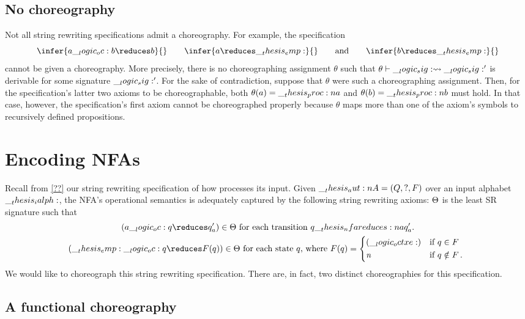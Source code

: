 \clearpage
\subsection{No choreography}

Not all string rewriting specifications admit a choreography.
For example, the specification
\begin{equation*}
  \infer{a \oc b \reduces b}{}
  \qquad
  \infer{a \reduces \emp}{}
  \qquad\text{and}\qquad
  \infer{b \reduces \emp}{}
\end{equation*}
cannot be given a choreography.
More precisely, there is no choreographing assignment $\theta$ such that $\theta \vdash \__logic_sig: \rightsquigarrow \__logic_sig:'$ is derivable for some signature $\__logic_sig:'$.
For the sake of contradiction, suppose that $\theta$ were such a choreographing assignment.
Then, for the specification's latter two axioms to be choreographable, both $\theta(a) = \__thesis_proc:n {a}$ and $\theta(b) = \__thesis_proc:n {b}$ must hold.
In that case, however, the specification's first axiom cannot be choreographed properly because $\theta$ maps more than one of the axiom's symbols to recursively defined propositions.


\section{Encoding \aclp*{NFA}}

Recall from \cref{??} our string rewriting specification of how  processes its input.
Given  $\__thesis_aut:n {A} = (Q, ?, F)$ over an input alphabet $\__thesis_ialph:$, the \ac{NFA}'s operational semantics is adequately captured by the following string rewriting axioms: $\Theta$ is the least \ac{SR} signature such that
\begin{gather*}
  (a \oc q \reduces q'_a) \in \srsig
  \text{ for each transition $q \nfareduces[a] q'_a$.}
  \\
  (\emp \oc q \reduces F(q)) \in \srsig
  \text{ for each state $q$, where }
  F(q) = \begin{cases*}
           (\octxe) & if $q \in F$ \\
           \symrej & if $q \notin F$\,.
         \end{cases*}
\end{gather*}
We would like to choreograph this string rewriting specification.
There are, in fact, two distinct choreographies for this specification.

\subsection{A functional choreography}

